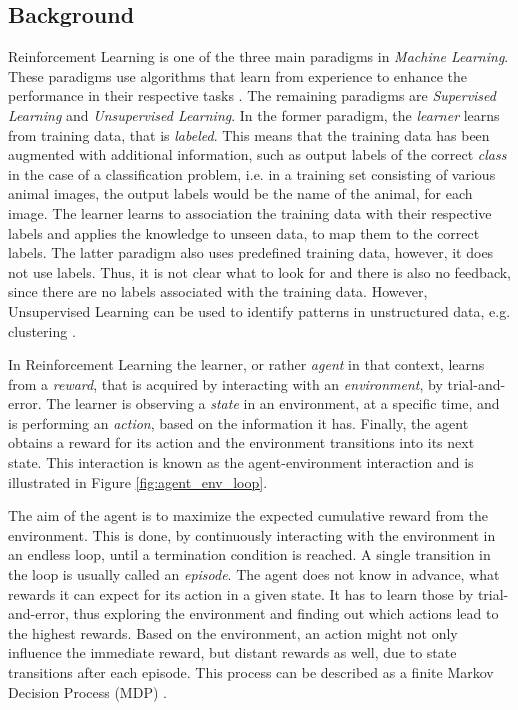 \subsection{Background}
Reinforcement Learning is one of the three main paradigms in \textit{Machine Learning}. These paradigms use algorithms that learn from experience to enhance the performance in their respective tasks \cite{mohri2018foundations}. The remaining paradigms are \textit{Supervised Learning} and \textit{Unsupervised Learning}. In the former paradigm, the \textit{learner} learns from training data, that is \textit{labeled}. This means that the training data has been augmented with additional information, such as output labels of the correct \textit{class} in the case of a classification problem, i.e. in a training set consisting of various animal images, the output labels would be the name of the animal, for each image. The learner learns to association the training data with their respective labels and applies the knowledge to unseen data, to map them to the correct labels. The latter paradigm also uses predefined training data, however, it does not use labels. Thus, it is not clear what to look for and there is also no feedback, since there are no labels associated with the training data. However, Unsupervised Learning can be used to identify patterns in unstructured data, e.g. clustering \cite{alzubi2018machine}.

In Reinforcement Learning the learner, or rather \textit{agent} in that context, learns from a \textit{reward}, that is acquired by interacting with an \textit{environment}, by trial-and-error. The learner is observing a \textit{state} in an environment, at a specific time, and is performing an \textit{action}, based on the information it has. Finally, the agent obtains a reward for its action and the environment transitions into its next state. This interaction is known as the agent-environment interaction and is illustrated in Figure \ref{fig:agent_env_loop}. 

The aim of the agent is to maximize the expected cumulative reward from the environment. This is done, by continuously interacting with the environment in an endless loop, until a termination condition is reached. A single transition in the loop is usually called an \textit{episode}. The agent does not know in advance, what rewards it can expect for its action in a given state. It has to learn those by trial-and-error, thus exploring the environment and finding out which actions lead to the highest rewards. Based on the environment, an action might not only influence the immediate reward, but distant rewards as well, due to state transitions after each episode. This process can be described as a finite Markov Decision Process (MDP) \cite{richardsutton2018}.

